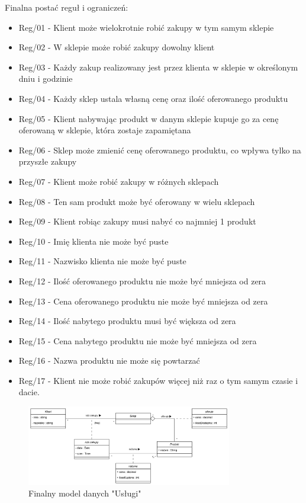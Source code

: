 \documentclass[a4paper,12pt]{article}
\begin{document}
Finalna postać reguł i ograniczeń:

\begin{itemize}
    \item Reg/01 - Klient może wielokrotnie robić zakupy w tym samym sklepie
    \item Reg/02 - W sklepie może robić zakupy dowolny klient
    \item Reg/03 - Każdy zakup realizowany jest przez klienta w sklepie w określonym dniu i godzinie
    \item Reg/04 - Każdy sklep ustala własną cenę oraz ilość oferowanego produktu 
    \item Reg/05 - Klient nabywając produkt w danym sklepie kupuje go za cenę oferowaną w sklepie, która zostaje zapamiętana
    \item Reg/06 - Sklep może zmienić cenę oferowanego produktu, co wpływa tylko na przyszłe zakupy
    \item Reg/07 - Klient może robić zakupy w różnych sklepach
    \item Reg/08 - Ten sam produkt może być oferowany w wielu sklepach
    \item Reg/09 - Klient robiąc zakupy musi nabyć co najmniej 1 produkt
    \item Reg/10 - Imię klienta nie może być puste
    \item Reg/11 - Nazwisko klienta nie może być puste
    \item Reg/12 - Ilość oferowanego produktu nie może być mniejsza od zera
    \item Reg/13 - Cena oferowanego produktu nie może być mniejsza od zera
    \item Reg/14 - Ilość nabytego produktu musi być większa od zera
    \item Reg/15 - Cena nabytego produktu nie może być mniejsza od zera
    \item Reg/16 - Nazwa produktu nie może się powtarzać
    \item Reg/17 - Klient nie może robić zakupów więcej niż raz o tym samym czasie i dacie.
\end{itemize}

\begin{figure}[H]
\centering
\includegraphics[width=0.8\textwidth]{images/improved.png}
\caption{Finalny model danych "Usługi"}
\label{fig:final_model}
\end{figure}
\end{document}
